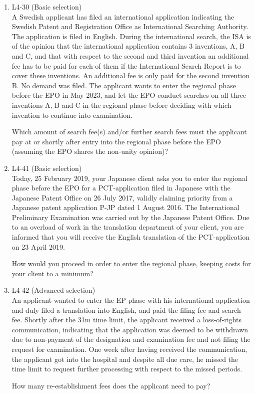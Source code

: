 \documentclass{report}
\begin{document}
\begin{enumerate}[label=\textbf{Answer \arabic*}]
\begin{enumerate}[label=\textbf{Answer \arabic*}]
    \item %
    L4-30 (Basic selection) \\
    A Swedish applicant has filed an international application indicating the Swedish Patent and Registration Office as International Searching Authority. The application is filed in English. During the international search, the ISA is of the opinion that the international application contains 3 inventions, A, B and C, and that with respect to the second and third invention an additional fee has to be paid for each of them if the International Search Report is to cover these inventions. An additional fee is only paid for the second invention B. No demand was filed. The applicant wants to enter the regional phase before the EPO in May 2023, and let the EPO conduct searches on all three inventions A, B and C in the regional phase before deciding with which invention to continue into examination.
    
    \vspace{1em}
    Which amount of search fee(s) and/or further search fees must the applicant pay at or shortly after entry into the regional phase before the EPO (assuming the EPO shares the non-unity opinion)?

    \item %
    L4-41 (Basic selection) \\
    Today, 25 February 2019, your Japanese client asks you to enter the regional phase before the EPO for a PCT-application filed in Japanese with the Japanese Patent Office on 26 July 2017, validly claiming priority from a Japanese patent application P-JP dated 1 August 2016. The International Preliminary Examination was carried out by the Japanese Patent Office. Due to an overload of work in the translation department of your client, you are informed that you will receive the English translation of the PCT-application on 23 April 2019.
    
    \vspace{1em}
    How would you proceed in order to enter the regional phase, keeping costs for your client to a minimum?

    \item %
    L4-42 (Advanced selection) \\
    An applicant wanted to enter the EP phase with his international application and duly filed a translation into English, and paid the filing fee and search fee. Shortly after the 31m time limit, the applicant received a loss-of-rights communication, indicating that the application was deemed to be withdrawn due to non-payment of the designation and examination fee and not filing the request for examination. One week after having received the communication, the applicant got into the hospital and despite all due care, he missed the time limit to request further processing with respect to the missed periods. 
    
    \vspace{1em}
    How many re-establishment fees does the applicant need to pay? 

\end{enumerate}
\end{enumerate}
\end{document}

